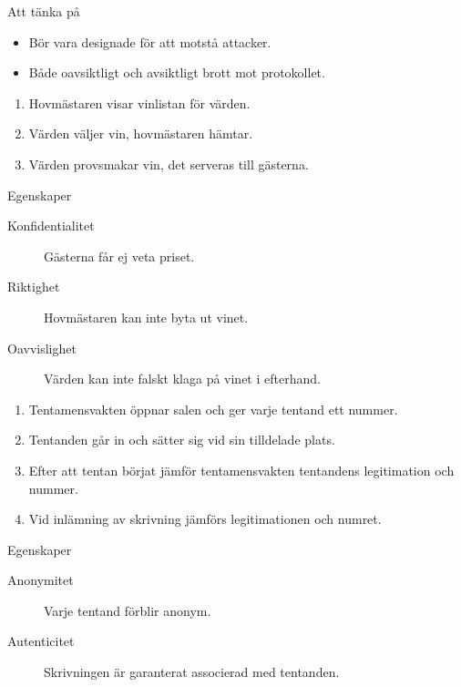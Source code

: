 \documentclass{beamer}
\theoremstyle{definition}
\theoremstyle{remark}
\begin{document}
\begin{frame}
  \begin{alertblock}{Att tänka på}
    \begin{itemize}
      \item Bör vara designade för att motstå attacker.
      \item Både oavsiktligt och avsiktligt brott mot protokollet.
    \end{itemize}
  \end{alertblock}
\end{frame}

\begin{frame}
  \begin{example}
    \begin{enumerate}
      \item Hovmästaren visar vinlistan för värden.
      \item Värden väljer vin, hovmästaren hämtar.
      \item Värden provsmakar vin, det serveras till gästerna.
    \end{enumerate}
  \end{example}

  \pause{}

  \begin{block}{Egenskaper}
    \begin{description}
      \item[Konfidentialitet] Gästerna får ej veta priset.
      \item[Riktighet] Hovmästaren kan inte byta ut vinet.
      \item[Oavvislighet] Värden kan inte falskt klaga på vinet i efterhand.
    \end{description}
  \end{block}
\end{frame}

\begin{frame}
  \begin{example}
    \begin{enumerate}
      \item Tentamensvakten öppnar salen och ger varje tentand ett nummer.
      \item Tentanden går in och sätter sig vid sin tilldelade plats.
      \item Efter att tentan börjat jämför tentamensvakten tentandens 
        legitimation och nummer.
      \item Vid inlämning av skrivning jämförs legitimationen och numret.
    \end{enumerate}
  \end{example}

  \pause{}

  \begin{block}{Egenskaper}
    \begin{description}
      \item[Anonymitet] Varje tentand förblir anonym.
      \item[Autenticitet] Skrivningen är garanterat associerad med tentanden.
    \end{description}
  \end{block}
\end{frame}
\end{document}
